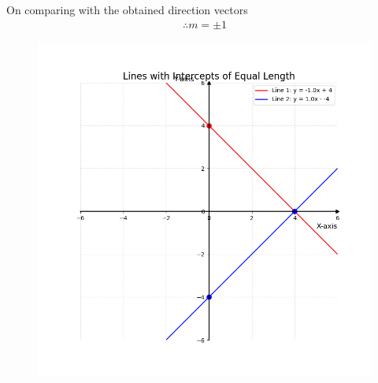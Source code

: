\documentclass[journal]{IEEEtran}
\begin{document}
			On comparing with the obtained direction vectors
	\begin{align}
		\therefore m = \pm1
	\end{align}	
	\begin{figure}[H]
		\centering
		\includegraphics[width = 0.6\columnwidth]{Figure_1.png}
		\caption*{}
		\label{fig1}
	\end{figure}
	
\end{document}
